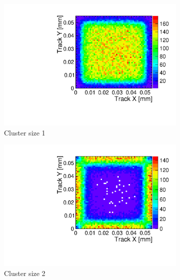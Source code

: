 \begin{figure}[htbp] \centering
  \begin{subfigure}[b]{0.23\textwidth}
    \includegraphics[width=\textwidth]{./figures/TestBeam/TrackPosWPixel_1hit_runW5_E2.pdf}
    \caption{Cluster size 1}
  \end{subfigure} \hfill
  \begin{subfigure}[b]{0.23\textwidth}
    \includegraphics[width=\textwidth]{./figures/TestBeam/TrackPosWPixel_2hit_runW5_E2.pdf}
    \caption{Cluster size 2}
  \end{subfigure} \hfill
  \begin{subfigure}[b]{0.23\textwidth}

\end{subfigure}
\end{figure}
